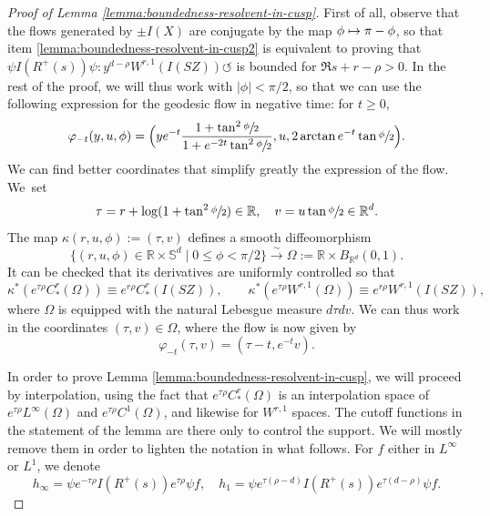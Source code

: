 \documentclass[JEP,XML,SOM,Unicode,NoFloatCountersInSection]{cedram}
\newcommand\mto{\mathchoice{\longmapsto}{\mapsto}{\mapsto}{\mapsto}}
\newcommand{\R}{\mathbb{R}}
\newcommand{\Ss}{\mathbb{S}}
\newcommand{\ZZ}{I(SZ)}
\theoremstyle{plain}
\theoremstyle{definition}
\begin{document}
\begin{proof}[Proof of Lemma \ref{lemma:boundedness-resolvent-in-cusp}]
First of all, observe that the flows generated by $\pm I(X)$ are conjugate by the map $\phi \mto \pi-\phi$, so that item \eqref{lemma:boundedness-resolvent-in-cusp2} is equivalent to proving that $\psi I(R^+(s)) \psi : y^{d-\rho} W^{r,1}(\ZZ) \circlearrowleft$ is bounded for $\Re s + r - \rho >0$. In the rest of the proof, we will thus work with $|\phi| < \pi/2$, so that we can use the following expression for the geodesic flow in negative time: for $t \geq 0$,
\begin{equation}
\label{equation:flot}
\varphi_{-t}(y,u,\phi) = \Bigl( y e^{-t} \frac{1+\tan^2\sfrac{\phi}{2}}{1+ e^{-2t} \tan^2\sfrac{\phi}{2}} ,u,2 \arctan e^{-t} \tan \sfrac{\phi}{2} \Bigr).
\end{equation}
We can find better coordinates that simplify greatly the expression of the flow. We~set
\[
\tau = r + \log(1+\tan^2\sfrac{\phi}{2})\in \R,\quad v = u \tan\sfrac{\phi}{2}\in \R^d.
\]
The map $\kappa(r,u,\phi):=(\tau,v)$ defines a smooth diffeomorphism
\[
\{(r,u,\phi)\in \R \times\Ss^d \mid 0 \leq \phi<\pi/2\}\stackrel\sim\to\Omega := \R\times B_{\R^d}(0, 1).
\]
It can be checked that its derivatives are uniformly controlled so that
\[
\kappa^\ast ( e^{\tau \rho} C^r_\ast(\Omega) ) \equiv e^{r\rho} C^r_\ast(\ZZ),\qquad \kappa^\ast ( e^{\tau \rho} W^{r,1}(\Omega)) \equiv e^{r \rho} W^{r,1}(\ZZ),
\]
where $\Omega$ is equipped with the natural Lebesgue measure $d\tau dv$.
We can thus work in the coordinates $(\tau,v)\in\Omega$, where the flow is now given by
\begin{equation}
\label{equation:flotbis}
\varphi_{-t}(\tau,v) = (\tau - t, e^{-t} v).
\end{equation}

In order to prove Lemma \ref{lemma:boundedness-resolvent-in-cusp}, we will proceed by interpolation, using the fact that $e^{\tau \rho} C^r_\ast(\Omega)$ is an interpolation space of $e^{\tau \rho} L^\infty(\Omega)$ and $e^{\tau\rho} C^1(\Omega)$, and likewise for $W^{r,1}$ spaces. The cutoff functions in the statement of the lemma are there only to control the support. We will mostly remove them in order to lighten the notation in what follows. For $f$ either in $L^\infty$ or $L^1$, we denote
\[
h_\infty = \psi e^{-\tau \rho} I(R^+(s)) e^{\tau \rho} \psi f,\quad h_1 = \psi e^{\tau (\rho-d)} I(R^+(s)) e^{\tau(d-\rho)} \psi f.
\]


\end{proof}
\end{document}
